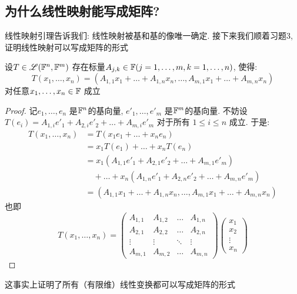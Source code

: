 \subsection{为什么线性映射能写成矩阵?}
线性映射引理告诉我们: 线性映射被基和基的像唯一确定. 接下来我们顺着习题3, 证明线性映射可以写成矩阵的形式
\begin{theorem}
    设\(T \in \mathscr{L}(\mathbb{F}^{n},\mathbb{F}^{m})\)
    存在标量\(A_{j,k} \in
    \mathbb{F} (j = 1, \dots ,m, k=1, \dots, n) \), 使得:
    \[
        T(x_{1},\dots,x_{n})=(A_{1,1}x_{1}+\dots+A_{1,n}x_{n},\dots,A_{m,1}x_{1}+\dots+A_{m,n}x_{n})
    \]
    对任意\(x_{1},\dots,x_{n} \in \mathbb{F}\) 成立
\end{theorem}

\begin{proof}
    记\(e_{1}, \dots, e_{n}\) 是\(\mathbb{F}^{n}\)的基向量,
    \(e'_{1}, \dots, e'_{m}\)
    是\(\mathbb{F}^{m}\)的基向量.
    不妨设 \(T(e_{i}) = A_{1,i}e'_{1} +
        A_{2,i}e'_{2} + \dots +
    A_{m,i}e'_{m}\) 对于所有 \(1\leq i\leq n\) 成立.
    于是:
    \begin{align*}
        T(x_{1},\dots,x_{n}) &= T(x_{1}e_{1} + \dots +
        x_{n}e_{n})\\
        &= x_{1}T(e_{1}) + \dots + x_{n}T(e_{n})\\
        &= x_{1}(A_{1,1}e'_{1} + A_{2,1}e'_{2} +
        \dots + A_{m,1}e'_{m}) \nonumber \\
        &\quad + \dots +
        x_{n}(A_{1,n}e'_{1} + A_{2,n}e'_{2} +
        \dots + A_{m,n}e'_{m})\\    &=
        (A_{1,1}x_{1}+\dots+A_{1,n}x_{n},\dots,A_{m,1}x_{1}+\dots+A_{m,n}x_{n})
    \end{align*}
    也即\[
        T(x_1, \dots, x_n) =
        \begin{pmatrix}
            A_{1,1} & A_{1,2} & \dots & A_{1,n} \\
            A_{2,1} & A_{2,2} & \dots & A_{2,n} \\
            \vdots  & \vdots  & \ddots & \vdots  \\
            A_{m,1} & A_{m,2} & \dots & A_{m,n}
        \end{pmatrix}
        \begin{pmatrix}
            x_1 \\
            x_2 \\
            \vdots \\
            x_n
        \end{pmatrix}
    \]
\end{proof}
这事实上证明了所有（有限维）线性变换都可以写成矩阵的形式


